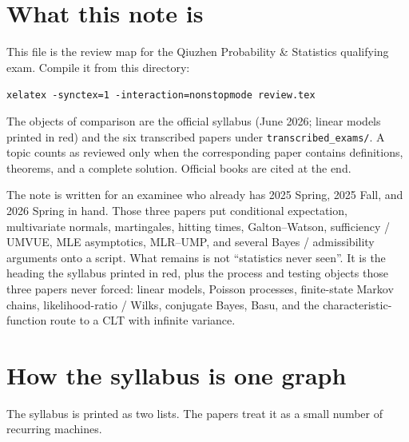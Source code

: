 \section{What this note is}
\label{sec:what}

This file is the review map for the Qiuzhen Probability \& Statistics qualifying exam. Compile it from this directory:

\begin{center}
\texttt{xelatex -synctex=1 -interaction=nonstopmode review.tex}
\end{center}

The objects of comparison are the official syllabus (June 2026; linear models printed in red) and the six transcribed papers under \texttt{transcribed\_exams/}. A topic counts as reviewed only when the corresponding paper contains definitions, theorems, and a complete solution. Official books are cited at the end.

The note is written for an examinee who already has 2025 Spring, 2025 Fall, and 2026 Spring in hand. Those three papers put conditional expectation, multivariate normals, martingales, hitting times, Galton--Watson, sufficiency / UMVUE, MLE asymptotics, MLR--UMP, and several Bayes / admissibility arguments onto a script. What remains is not ``statistics never seen''. It is the heading the syllabus printed in red, plus the process and testing objects those three papers never forced: linear models, Poisson processes, finite-state Markov chains, likelihood-ratio / Wilks, conjugate Bayes, Basu, and the characteristic-function route to a CLT with infinite variance.

\section{How the syllabus is one graph}
\label{sec:graph}

The syllabus is printed as two lists. The papers treat it as a small number of recurring machines.

